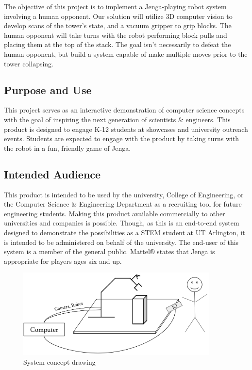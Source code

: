 The objective of this project is to implement a Jenga-playing robot system involving a human opponent. Our solution will utilize 3D computer vision to develop scans of the tower's state, and a vacuum gripper to grip blocks. The human opponent will take turns with the robot performing block pulls and placing them at the top of the stack. The goal isn't necessarily to defeat the human opponent, but build a system capable of make multiple moves prior to the tower collapsing. 

\subsection{Purpose and Use}
This project serves as an interactive demonstration of computer science concepts with the goal of inspiring the next generation of scientists \& engineers. This product is designed to engage K-12 students at showcases and university outreach events. Students are expected to engage with the product by taking turns with the robot in a fun, friendly game of Jenga.

\subsection{Intended Audience}
This product is intended to be used by the university, College of Engineering, or the Computer Science \& Engineering Department as a recruiting tool for future engineering students. Making this product available commercially to other universities and companies is possible. Though, as this is an end-to-end system designed to demonstrate the possibilities as a STEM student at UT Arlington, it is intended to be administered on behalf of the university. The end-user of this system is a member of the general public. Mattel$\circledR$ states that Jenga is appropriate for players ages six and up.

\begin{figure}[h!]
	\centering
   	\includegraphics[width=0.90\textwidth]{images/system_setup}
    \caption{System concept drawing}
\end{figure}
